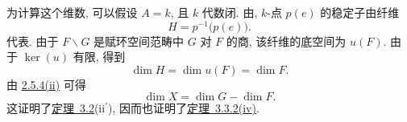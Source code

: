 为计算这个维数, 可以假设 \(A=k\), 且 \(k\) 代数闭.
由,
\(k\)-点 \(p(e)\) 的稳定子由纤维
\[
  H=p^{-1}\bigl(p(e)\bigr).
\]
代表. 由于 \(F\backslash G\) 是赋环空间范畴中 \(G\) 对 \(F\) 的商,
该纤维的底空间为 \(u(F)\). 由于 \(\ker(u)\) 有限, 得到
\[
  \dim H=\dim u(F)=\dim F.
\]
由 \hyperref[concl:sga3-VIA-2.5.4-ii]{2.5.4(ii)} 可得
\[
  \dim X=\dim G-\dim F.
\]
这证明了\hyperref[concl:sga3-VIA-3.2-ii-prime]{定理~3.2}(ii\(^{\prime}\)),
因而也证明了\hyperref[concl:sga3-VIA-3.3.2-iv]{定理~3.3.2(iv)}.
